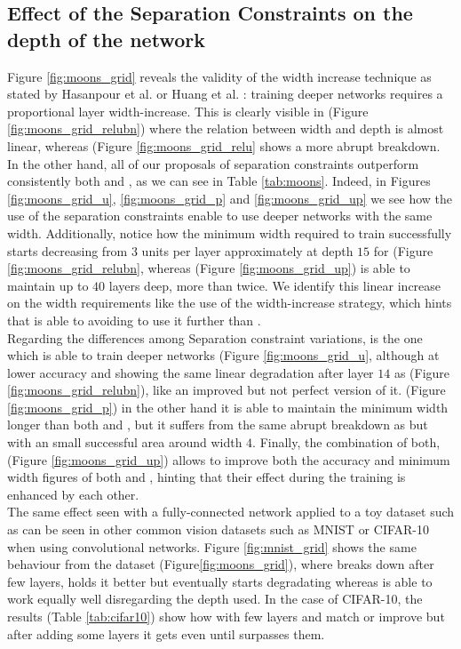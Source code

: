 \subsection{Effect of the Separation Constraints on the depth of the network}

Figure \ref{fig:moons_grid} reveals the validity of the width increase technique as stated by Hasanpour et al. \cite{simpnet} or Huang et al. \cite{densenet}: training deeper networks requires a proportional layer width-increase. This is clearly visible in \ReLUBN (Figure \ref{fig:moons_grid_relubn}) where the relation between width and depth is almost linear, whereas \ReLU (Figure \ref{fig:moons_grid_relu} shows a more abrupt breakdown.
\\
In the other hand, all of our proposals of separation constraints outperform consistently both \ReLU and \ReLUBN, as we can see in Table \ref{tab:moons}.  Indeed, in Figures \ref{fig:moons_grid_u}, \ref{fig:moons_grid_p} and \ref{fig:moons_grid_up} we see how the use of the separation constraints enable to use deeper networks with the same width. Additionally, notice how the minimum width required to train successfully starts decreasing from $3$ units per layer approximately at depth $15$ for \ReLUBN (Figure \ref{fig:moons_grid_relubn}, whereas \SepUnitPoint (Figure \ref{fig:moons_grid_up}) is able to maintain up to $40$ layers deep, more than twice. We identify this linear increase on the width requirements like the use of the width-increase strategy, which hints that \SepPoint is able to avoiding to use it further than \ReLUBN.
\\
Regarding the differences among Separation constraint variations, \SepUnit is the one which is able to train deeper networks (Figure \ref{fig:moons_grid_u}, although at lower accuracy and showing the same linear degradation after layer $14$ as \ReLUBN (Figure \ref{fig:moons_grid_relubn}), like an improved but not perfect version of it. \SepPoint (Figure \ref{fig:moons_grid_p}) in the other hand it is able to maintain the minimum width longer than both \ReLUBN and \SepUnit, but it suffers from the same abrupt breakdown as \ReLU but with an small successful area around width $4$. Finally, the combination of both, \SepUnitPoint (Figure \ref{fig:moons_grid_up}) allows to improve both the accuracy and minimum width figures of both \SepUnit and \SepPoint, hinting that their effect during the training is enhanced by each other.
\\
The same effect seen with a fully-connected network applied to a toy dataset such as \moons can be seen in other common vision datasets such as MNIST \cite{mnist} or CIFAR-10 \cite{cifar10} when using convolutional networks. Figure \ref{fig:mnist_grid} shows the same behaviour from the \moons dataset (Figure\ref{fig:moons_grid}), where \ReLU breaks down after few layers, \ReLUBN holds it better but eventually starts degradating whereas \SepUnitPoint is able to work equally well disregarding the depth used. In the case of CIFAR-10, the results (Table \ref{tab:cifar10}) show how with few layers \ReLU and \ReLUBN match or improve \SepUnitPoint but after adding some layers it gets even until \SepUnitPoint surpasses them.


